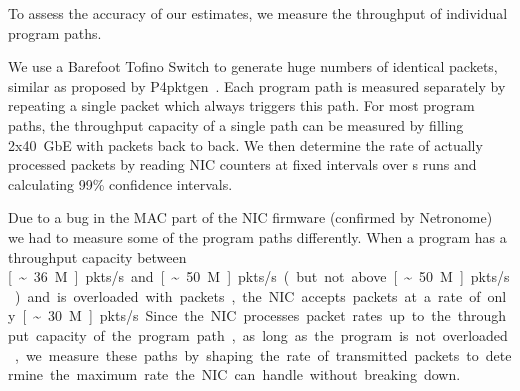 \documentclass[sigconf,screen,authordraft]{acmart}
\newcommand{\afblock}[1]{\noindent{\textbf{#1.}}}
\begin{document}
To assess the accuracy of our estimates, we measure the throughput of individual program paths.

\afblock{Testbed}
We use a Barefoot Tofino Switch to generate huge numbers of identical packets, similar as proposed by P4pktgen~\cite{p4pktgen}.
Each program path is measured separately by repeating a single packet which always triggers this path.
For most program paths, the throughput capacity of a single path can be measured by filling 2x40~GbE with packets back to back.
We then determine the rate of actually processed packets by reading NIC counters at fixed intervals over \unit[30]{s} runs and calculating 99\% confidence intervals.

Due to a bug in the MAC part of the NIC firmware (confirmed by Netronome) we had to measure some of the program paths differently.
When a program has a throughput capacity between \unit[\sim36 M]{pkts/s} and \unit[\sim50 M]{pkts/s} (but not above \unit[\sim50 M]{pkts/s}) and is overloaded with packets, the NIC accepts packets at a rate of only \unit[\sim30 M]{pkts/s}.
Since the NIC processes packet rates up to the throughput capacity of the program path, as long as the program is not overloaded, we measure these paths by shaping the rate of transmitted packets to determine the maximum rate the NIC can handle without breaking down.
\end{document}
